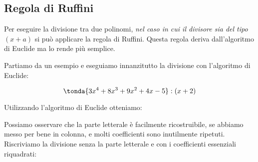 \subsection{Regola di Ruffini}
\label{subsec:divpol_divisione_ruffini}

Per eseguire la divisione tra due polinomi, \emph{nel caso in cui il
divisore sia del tipo \((x+a)\)} si può applicare la regola di Ruffini.
Questa regola deriva dall'algoritmo di Euclide ma lo rende più semplice.

% 

Partiamo da un esempio e eseguiamo innanzitutto la divisione con l'algoritmo 
di Euclide:


\[\tonda{3 x^4 +8 x^3 +9 x^2 +4 x -5} : (x + 2)\]

Utilizzando l'algoritmo di Euclide otteniamo:

\begin{inaccessibleblock}
\begin{center}
% 
\ruffinia
\end{center}
\end{inaccessibleblock}

Possiamo osservare che la parte letterale è facilmente ricostruibile, se 
abbiamo messo per bene in colonna, e molti coefficienti sono inutilmente 
ripetuti. Riscriviamo la divisione senza la parte letterale e con i
coefficienti essenziali riquadrati:

\begin{inaccessibleblock}
\begin{center}
%  
\ruffinib
\end{center}
\end{inaccessibleblock}


